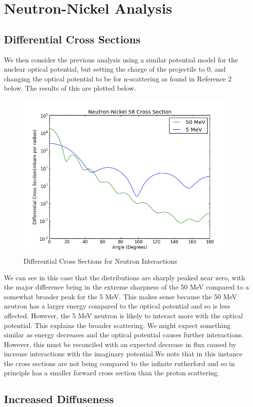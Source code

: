 \documentclass[paper=a4, fontsize=11pt]{scrartcl} %
\numberwithin{equation}{section} %
\numberwithin{figure}{section} %
\numberwithin{table}{section} %
\begin{document}
\section{Neutron-Nickel Analysis}
\subsection{Differential Cross Sections}
We then consider the previous analysis using a similar potential model for the nuclear optical potential, but setting the charge of the projectile to 0, and changing the optical potential to be for n-scattering as found in Reference 2 below. The results of this are plotted below.\\


 \begin{figure}[hbt]
        \centering
	\includegraphics[width=.6\textwidth]{CrossSectionsNEns}
        \caption{Differential Cross Sections for Neutron Interactions}
\end{figure}

We can see in this case that the distributions are sharply peaked near zero, with the major difference being in the extreme sharpness of the 50 MeV compared to a somewhat  broader peak for the 5 MeV. This makes sense because the 50 MeV neutron has a larger energy compared to the optical potential and so is less affected. However, the 5 MeV neutron  is likely to interact more with the optical potential. This explains the broader scattering. We might expect something similar as energy decreases and the optical potential causes further interactions. However, this must be reconciled with an expected decrease in flux caused by increase interactions with the imaginary potential.We note that in this instance the cross sections are not being compared to the infinite rutherford and so in principle has a smaller forward cross section than the proton scattering. \\

\subsection{Increased Diffuseness}
\end{document}
